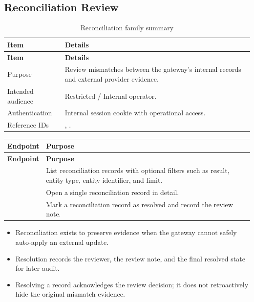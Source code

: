 \subsection{Reconciliation Review}

\begin{longtable}{@{}L{0.25\textwidth}L{0.65\textwidth}@{}}
\caption{Reconciliation family summary}\\
\toprule
\textbf{Item} & \textbf{Details} \\
\midrule
\endfirsthead
\toprule
\textbf{Item} & \textbf{Details} \\
\midrule
\endhead
Purpose & Review mismatches between the gateway's internal records and external
provider evidence. \\
\bodyrowrule
Intended audience & Restricted / Internal operator. \\
\bodyrowrule
Authentication & Internal session cookie with operational access. \\
\bodyrowrule
Reference IDs & , . \\
\bottomrule
\end{longtable}

\begin{longtable}{@{}L{0.34\textwidth}L{0.56\textwidth}@{}}
\toprule
\textbf{Endpoint} & \textbf{Purpose} \\
\midrule
\endfirsthead
\toprule
\textbf{Endpoint} & \textbf{Purpose} \\
\midrule
\endhead
{} & List reconciliation records with optional
filters such as result, entity type, entity identifier, and limit. \\
\bodyrowrule
{} & Open a single reconciliation
record in detail. \\
\bodyrowrule
{} & Mark a reconciliation
record as resolved and record the review note. \\
\bottomrule
\end{longtable}

\begin{itemize}
  \item Reconciliation exists to preserve evidence when the gateway cannot
  safely auto-apply an external update.
  \item Resolution records the reviewer, the review note, and the final
  resolved state for later audit.
  \item Resolving a record acknowledges the review decision; it does not
  retroactively hide the original mismatch evidence.
\end{itemize}

